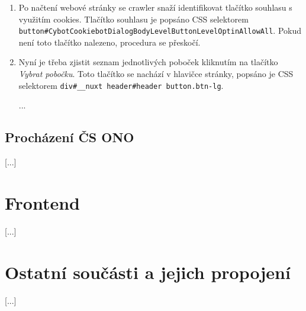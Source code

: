 \begin{enumerate}
    \item Po načtení webové stránky se crawler snaží identifikovat tlačítko
        souhlasu s využitím cookies. Tlačítko souhlasu je popsáno CSS selektorem\\
        \texttt{button\#CybotCookiebotDialogBodyLevelButtonLevelOptinAllowAll}.
        Pokud není toto tlačítko nalezeno, procedura se přeskočí.
    \item Nyní je třeba zjistit seznam jednotlivých poboček kliknutím na tlačítko
        \emph{Vybrat pobočku}. Toto tlačítko se nachází v hlavičce stránky,
        popsáno je CSS selektorem \texttt{div\#\_\_nuxt header\#header button.btn-lg}.
    \item [...]
\end{enumerate}

\subsection{Procházení ČS ONO}

[...]

\section{Frontend}

[...]

\section{Ostatní součásti a jejich propojení}

[...]

\endinput
